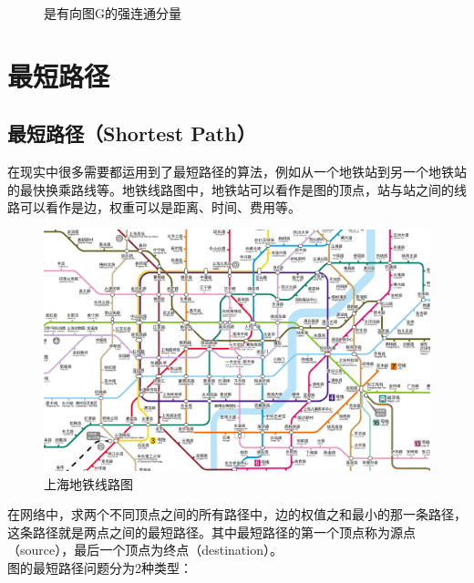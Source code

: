 \begin{figure}[H]
	\centering
	\caption{是有向图G的强连通分量}
\end{figure}

\newpage

\section{最短路径}

\subsection{最短路径（Shortest Path）}

在现实中很多需要都运用到了最短路径的算法，例如从一个地铁站到另一个地铁站的最快换乘路线等。地铁线路图中，地铁站可以看作是图的顶点，站与站之间的线路可以看作是边，权重可以是距离、时间、费用等。\\

\begin{figure}[H]
	\centering
	\includegraphics[scale=0.3]{img/C8/8-6/1.png}
	\caption{上海地铁线路图}
\end{figure}

在网络中，求两个不同顶点之间的所有路径中，边的权值之和最小的那一条路径，这条路径就是两点之间的最短路径。其中最短路径的第一个顶点称为源点（source），最后一个顶点为终点（destination）。\\

图的最短路径问题分为2种类型：

